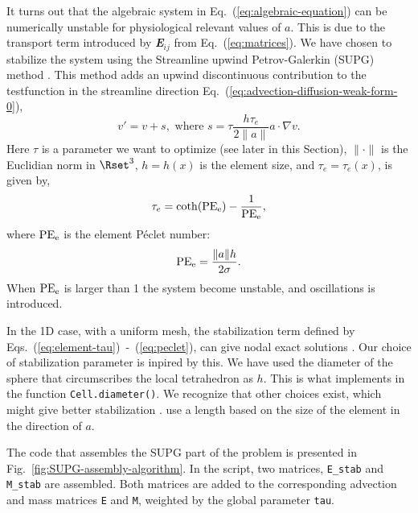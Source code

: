 It turns out that the algebraic system in Eq.~(\ref{eq:algebraic-equation}) can be numerically unstable for physiological relevant values of $a$. This is due to the transport term introduced by {\bfseries\itshape E}$_{ij}$ from Eq.~(\ref{eq:matrices}). We have chosen to stabilize the system using the Streamline upwind Petrov-Galerkin (SUPG) method \cite{BrooksHughes1982}. This method adds an upwind discontinuous contribution to the testfunction in the streamline direction Eq.~(\ref{eq:advection-diffusion-weak-form-0}),
\begin{equation}
  \label{eq:stabilizing-term}
  v' = v+s, \text{ where } s = \tau\frac{h\tau_e}{2\|a\|}a\cdot\nabla v.
\end{equation}
Here $\tau$ is a parameter we want to optimize (see later in this Section), $\|\cdot\|$ is the Euclidian norm in $\Rset^3$, $h=h(x)$ is the element size, and $\tau_e=\tau_e(x)$, is given by,
\begin{equation}
  \label{eq:element-tau}
  \tau_e=\coth(\mathrm{PE}_{\mathrm{e}})-\frac{1}{\mathrm{PE}_{\mathrm{e}}},
\end{equation}
where $\mathrm{PE}_{\mathrm{e}}$ is the element P\'eclet number:
\begin{equation}
  \label{eq:peclet}
  \mathrm{PE}_{\mathrm{e}} = \frac{\|a\|h}{2\sigma}.
\end{equation}
When $\mathrm{PE}_{\mathrm{e}}$ is larger than 1 the system become unstable, and oscillations is introduced.\par

In the 1D case, with a uniform mesh, the stabilization term defined by Eqs.~(\ref{eq:element-tau})~-~(\ref{eq:peclet}), can give nodal exact solutions \cite{ChristieGriffithsMitchellEtAl1976,BrooksHughes1982}. Our choice of stabilization parameter is inpired by this. We have used the diameter of the sphere that circumscribes the local tetrahedron as $h$. This is what \dolfin implements in the function \texttt{Cell.diameter()}. We recognize that other choices exist, which might give better stabilization \cite{JohnKnobloch2007}. \citet{TezduyarPark1986} use a length based on the size of the element in the direction of $a$.\par

The \pydolfin code that assembles the SUPG part of the problem is presented in Fig.~\ref{fig:SUPG-assembly-algorithm}. In the script, two matrices, \texttt{E\_stab} and \texttt{M\_stab} are assembled. Both matrices are added to the corresponding advection and mass matrices \texttt{E} and \texttt{M}, weighted by the global parameter \texttt{tau}.\par

